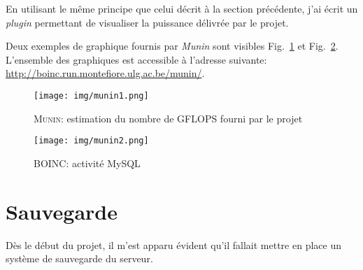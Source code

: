 \documentclass[a4paper, 11pt]{report}
\begin{document}
En utilisant le même principe que celui décrit à la section précédente, j'ai écrit un \textit{plugin} permettant de visualiser la puissance délivrée par le projet.

Deux exemples de graphique fournis par \textit{Munin} sont visibles Fig.~\ref{munin1} et Fig.~\ref{munin2}. L'ensemble des graphiques est accessible à l'adresse suivante: \url{http://boinc.run.montefiore.ulg.ac.be/munin/}.

\begin{figure}[!h]
\centering
\texttt{[image: img/munin1.png]}
\caption{\textsc{Munin}: estimation du nombre de GFLOPS fourni par le projet}
\label{munin1}
\end{figure}

\begin{figure}[!h]
\centering
\texttt{[image: img/munin2.png]}
\caption{\textsc{BOINC}: activité MySQL}
\label{munin2}
\end{figure}


\section{Sauvegarde}
Dès le début du projet, il m'est apparu évident qu'il fallait mettre en place un système de sauvegarde du serveur.
\end{document}
